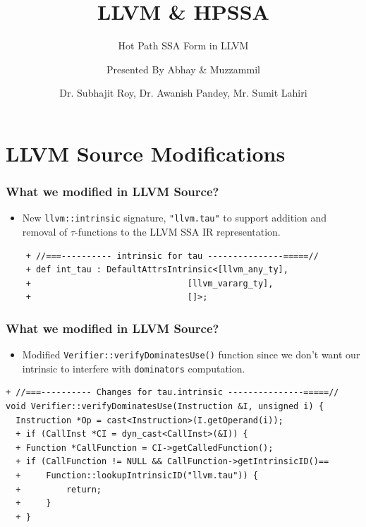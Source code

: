 \documentclass{beamer}
\title[\url{https://google.com}] %
{LLVM \& HPSSA}
\subtitle{Hot Path SSA Form in LLVM}
\author[VIP1 \& VIP2] %
{Presented By Abhay\inst{1} \& Muzzammil\inst{1}}
\institute[IDK] %
{
	\inst{1}%
	IIT Kanpur\\
	PRAISE Group
}
\date[01/03/2022] %
{Dr. Subhajit Roy, Dr. Awanish Pandey, Mr. Sumit Lahiri}
\begin{document}
\frame{\titlepage}
\footnotesize
\section{LLVM Source Modifications}

\begin{frame}[fragile]
	\frametitle{What we modified in LLVM Source?}
	\begin{itemize}
		\item New \texttt{llvm::intrinsic} signature, \texttt{"llvm.tau"} to support addition and removal of $\tau$-functions to the LLVM SSA IR representation. 
	\end{itemize}
	\begin{verbatim}
	+ //===---------- intrinsic for tau ---------------=====//
	+ def int_tau : DefaultAttrsIntrinsic<[llvm_any_ty],
	+                               [llvm_vararg_ty],
	+                               []>;
	\end{verbatim}
\end{frame}
\footnotesize
\begin{frame}[fragile]
\frametitle{What we modified in LLVM Source?}
\begin{itemize}
	\item Modified \texttt{Verifier::verifyDominatesUse()} function since we don't want our intrinsic to interfere with \texttt{dominators} computation.  
\end{itemize}
\begin{verbatim}
+ //===---------- Changes for tau.intrinsic ---------------=====//
void Verifier::verifyDominatesUse(Instruction &I, unsigned i) {
  Instruction *Op = cast<Instruction>(I.getOperand(i));
  +	if (CallInst *CI = dyn_cast<CallInst>(&I)) {
  +	Function *CallFunction = CI->getCalledFunction();
  +	if (CallFunction != NULL && CallFunction->getIntrinsicID()==
  +		Function::lookupIntrinsicID("llvm.tau")) {
  +			return;
  +		}
  +	}
	\end{verbatim}
\end{frame}
\end{document}
